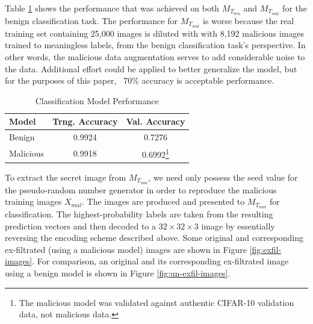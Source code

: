 Table \ref{tab:good-bad-model-performance} shows the performance that was achieved on both $M_{T_{ben}}$ and $M_{T_{mal}}$ for the benign classification task.  The performance for $M_{T_{mal}}$ is worse because the real training set containing 25,000 images is diluted with with 8,192 malicious images trained to meaningless labels, from the benign classification task's perspective.  In other words, the malicious data augmentation serves to add considerable noise to the data.  Additional effort could be applied to better generalize the model, but for the purposes of this paper, ~70\% accuracy is acceptable performance.

\begin{table}[ht]
    \caption{Classification Model Performance}
    \label{tab:good-bad-model-performance}
    \begin{tabular}{l|c|c}
        \toprule
        Model       &Trng. Accuracy    &Val. Accuracy \\
        \midrule
        Benign      &0.9924            &0.7276 \\
        Malicious   &0.9918            &0.6992\footnote{The malicious model was validated against authentic CIFAR-10 validation data, not malicious data.} \\
        \bottomrule
    \end{tabular}
\end{table}

To extract the secret image from $M_{T_{mal}}$, we need only possess the seed value for the pseudo-random number generator in order to reproduce the malicious training images $X_{mal}$.  The images are produced and presented to $M_{T_{mal}}$ for classification.  The highest-probability labels are taken from the resulting prediction vectors and then decoded to a $32 \times 32 \times 3$ image by essentially reversing the encoding scheme described above.  Some original and corresponding ex-filtrated (using a malicious model) images are shown in Figure \ref{fig:exfil-images}.  For comparison, an original and its corresponding ex-filtrated image using a benign model is shown in Figure \ref{fig:un-exfil-images}.

